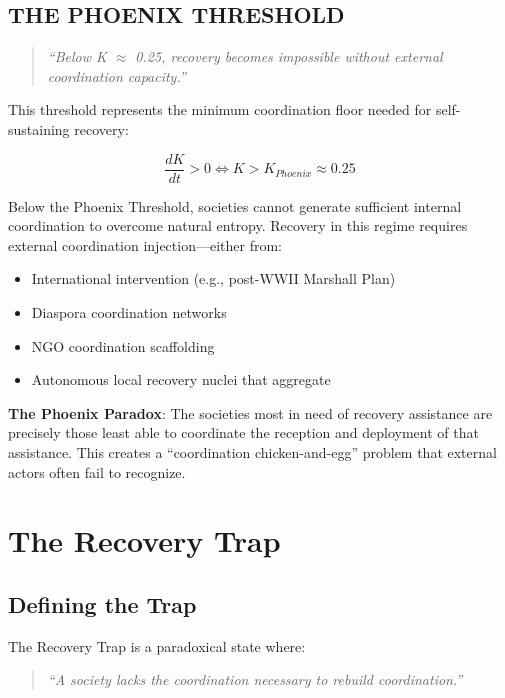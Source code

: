 \documentclass[11pt,letterpaper]{article}
\newcommand{\kindex}{K}
\begin{document}
\subsection{THE PHOENIX THRESHOLD}

\begin{quote}
\textit{``Below K $\approx$ 0.25, recovery becomes impossible without external coordination capacity.''}
\end{quote}

This threshold represents the minimum coordination floor needed for self-sustaining recovery:

\begin{equation}
\frac{d\kindex}{dt} > 0 \iff \kindex > \kindex_{Phoenix} \approx 0.25
\label{eq:phoenix}
\end{equation}

Below the Phoenix Threshold, societies cannot generate sufficient internal coordination to overcome natural entropy. Recovery in this regime requires external coordination injection---either from:
\begin{itemize}
\item International intervention (e.g., post-WWII Marshall Plan)
\item Diaspora coordination networks
\item NGO coordination scaffolding
\item Autonomous local recovery nuclei that aggregate
\end{itemize}

\textbf{The Phoenix Paradox}: The societies most in need of recovery assistance are precisely those least able to coordinate the reception and deployment of that assistance. This creates a ``coordination chicken-and-egg'' problem that external actors often fail to recognize.

\section{The Recovery Trap}
\label{sec:trap}

\subsection{Defining the Trap}

The Recovery Trap is a paradoxical state where:

\begin{quote}
\textit{``A society lacks the coordination necessary to rebuild coordination.''}
\end{quote}
\end{document}
